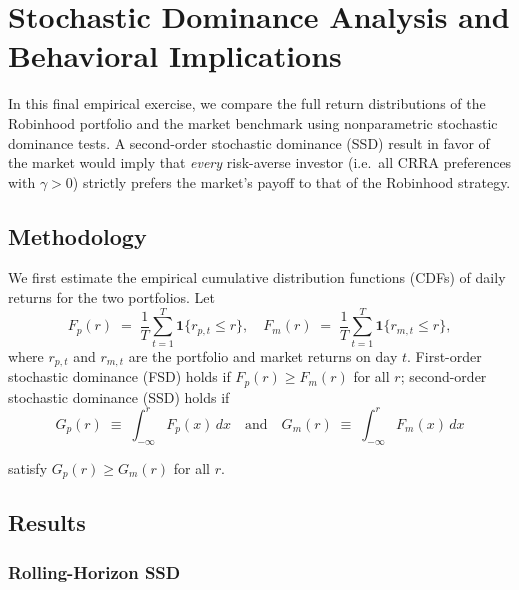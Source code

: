 \section{Stochastic Dominance Analysis and Behavioral Implications}

In this final empirical exercise, we compare the full return distributions of the Robinhood portfolio and the market benchmark using nonparametric stochastic dominance tests.  A second-order stochastic dominance (SSD) result in favor of the market would imply that \emph{every} risk-averse investor (i.e.\ all CRRA preferences with \(\gamma>0\)) strictly prefers the market's payoff to that of the Robinhood strategy.

\subsection{Methodology}
We first estimate the empirical cumulative distribution functions (CDFs) of daily returns for the two portfolios.  Let
\begin{equation}    
    F_{p}(r) \;=\; \frac{1}{T}\sum_{t=1}^{T}\mathbf{1}\{r_{p,t}\le r\},
    \quad
    F_{m}(r) \;=\; \frac{1}{T}\sum_{t=1}^{T}\mathbf{1}\{r_{m,t}\le r\},
\end{equation}
where \(r_{p,t}\) and \(r_{m,t}\) are the portfolio and market returns on day \(t\).  First-order stochastic dominance (FSD) holds if \(F_{p}(r)\ge F_{m}(r)\) for all \(r\); second-order stochastic dominance (SSD) holds if
\begin{equation}    
    G_{p}(r) \;\equiv\;\int_{-\infty}^{r}F_{p}(x)\,dx
    \quad\text{and}\quad
    G_{m}(r)\;\equiv\;\int_{-\infty}^{r}F_{m}(x)\,dx
\end{equation}

satisfy \(G_{p}(r)\ge G_{m}(r)\) for all \(r\).


\subsection{Results}
\subsubsection{Rolling-Horizon SSD}
